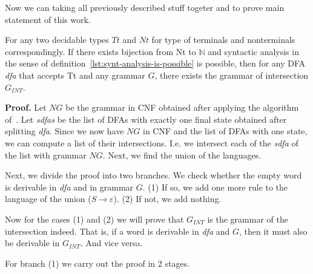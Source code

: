 Now we can taking all previously described stuff togeter and to prove main statement of this work.


\begin{theorem}
    For any two decidable types $Tt$ and $Nt$ for type of terminals and nonterminals correspondingly. If there exists bijection from Nt to $\mathbb{N}$ and syntactic analysis in the sense of definition~\ref{lst:synt-analysis-is-possible} is possible, then for any DFA \textit{dfa} that accepts Tt and any grammar $G$, there exists the grammar of intersection $G_{INT}$.
\end{theorem}   

\textbf{Proof.} 
Let $NG$ be the grammar in CNF obtained after applying the algorithm of~\cite{smolkaHofmann2016}. Let \textit{sdfas} be the list of DFAs with exactly one final state obtained after splitting \textit{dfa}.
Since we now have $NG$ in CNF and the list of DFAs with one state, we can compute a list of their intersections.
I.e. we intersect each of the \textit{sdfa} of the list with grammar $NG$.
Next, we find the union of the languages. 

Next, we divide the proof into two branches.
We check whether the empty word is derivable in \textit{dfa} and in grammar $G$.
(1) If so, we add one more rule to the language of the union ($ S \to \varepsilon$). (2) If not, we add nothing.

Now for the cases (1) and (2) we will prove that $G_{INT}$ is the grammar of the intersection indeed.
That is, if a word is derivable in \textit{dfa} and $G$, then it must also be derivable in $G_{INT}$. And vice versa.

For branch (1) we carry out the proof in 2 stages.

